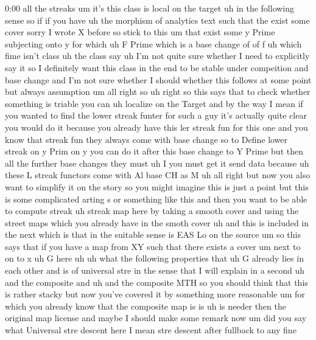\begin{unfinished}{0:00}
all  the
streaks
um  it's  this  class  is  local  on  the
target  uh  in  the  following  sense  so  if
if  you
have
uh  the  morphism  of  analytics  text  such
that  the  exist  some  cover
sorry  I  wrote  X  before  so  stick  to
this  um  that  exist  some  y  Prime
subjecting  onto  y  for
which  uh  F  Prime  which  is  a  base  change
of  of
f
uh  which  fime  isn't  class  uh  the
class
say  uh  I'm  not  quite  sure
whether  I  need  to  explicitly  say
it  so  I  definitely  want  this  class  in
the  end  to  be  stable  under  compeition
and  base  change  and  I'm  not  sure  whether
I  should  whether  this  follows  at  some
point
but  always
assumption
um  all  right  so  uh
right  so  this  says  that  to  check  whether
something  is  triable  you  can  uh  localize
on  the  Target  and  by  the  way  I  mean  if
you  wanted  to  find  the  lower  streak
funter  for  such  a  guy  it's  actually
quite  clear  you  would  do  it  because  you
already  have  this  ler  streak  fun  for
this  one  and  you  know  that  streak  fun
they  always  come  with  base  change  so  to
Define  lower  streak  on  y  Prim  on  y  you
can  do  it  after  this  base  change  to  Y
Prime  but  then  all  the  further  base
changes  they  must  uh  I  you  must  get  it
send  data
because
uh  these  L  streak  functors  come  with  Al
base  CH  as
M  uh  all  right  but  now  you  also  want  to
simplify  it  on  the  story  so  you  might
imagine  this  is  just  a  point  but  this  is
some  complicated  arting  s  or  something
like  this  and  then  you  want  to  be  able
to  compute  streak  uh  streak  map  here  by
taking  a  smooth  cover  and  using  the
street  maps  which  you  already  have  in
the  smoth  cover  uh  and  this  is  included
in  the  next  which  is  that  in  the
suitable  sense  is
EAS  Lo  on  the
source  um  so  this  says  that  if  you  have
a  map  from
XY  such
that  there  exists  a  cover
um  next  to  on  to
x
uh  G  here
uh  uh  what  the  following  properties  that
uh  G  already  lies  in  each
other  and  is  of  universal  stre  in  the
sense  that  I  will  explain  in  a
second
uh  and  the  composite  and  uh  and  the
composite
MTH  so  you  should  think  that  this  is
rather  stacky  but  now  you've  covered  it
by  something  more  reasonable  um  for
which  you  already  know  that  the
composite  map  is  is  uh  is
needer  then  the  original  map
license  and  maybe  I  should  make  some
remark
now
um  did  you  say
what  Universal  stre  descent  here  I  mean
stre  descent  after  fullback  to  any  fine

\end{unfinished}
